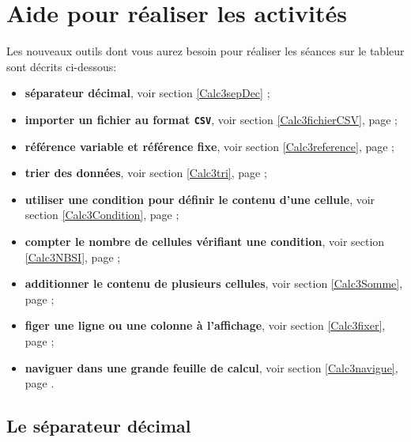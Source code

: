 


%
%
%
%

\pagebreak

\section{Aide pour réaliser les activités}\label{AideTableur03}

Les nouveaux outils dont vous aurez besoin pour réaliser les séances sur le tableur sont décrits ci-dessous:
\begin{itemize}
	\item \textbf{séparateur décimal}, voir section \ref{Calc3sepDec} ;
	\item \textbf{importer un fichier au format \texttt{CSV}}, voir section \ref{Calc3fichierCSV}, page \pageref{Calc3fichierCSV} ;
	\item \textbf{référence variable et référence fixe}, voir section \ref{Calc3reference}, page \pageref{Calc3reference} ;
	\item \textbf{trier des données}, voir section \ref{Calc3tri}, page \pageref{Calc3tri} ;
	\item \textbf{utiliser une condition pour définir le contenu d'une cellule}, voir section \ref{Calc3Condition}, page \pageref{Calc3Condition} ;
	\item \textbf{compter le nombre de cellules vérifiant une condition}, voir section \ref{Calc3NBSI}, page \pageref{Calc3NBSI} ;
	\item \textbf{additionner le contenu de plusieurs cellules}, voir section \ref{Calc3Somme}, page \pageref{Calc3Somme} ;
	\item \textbf{figer une ligne ou une colonne à l'affichage}, voir section \ref{Calc3fixer}, page \pageref{Calc3fixer} ;
	\item \textbf{naviguer dans une grande feuille de calcul}, voir section \ref{Calc3navigue}, page \pageref{Calc3navigue}.
\end{itemize}




\subsection{Le séparateur décimal}\label{Calc3sepDec}

